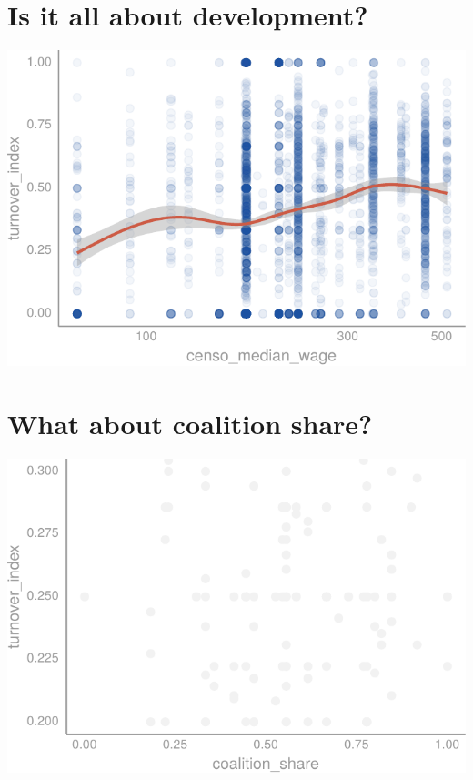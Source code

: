 \documentclass[12pt,]{article}
\begin{document}
\hypertarget{is-it-all-about-development}{%
\section{Is it all about
development?}\label{is-it-all-about-development}}

\begin{center}\includegraphics{dissertation_files/figure-latex/unnamed-chunk-33-1} \end{center}

\hypertarget{what-about-coalition-share}{%
\section{What about coalition share?}\label{what-about-coalition-share}}

\begin{center}\includegraphics{dissertation_files/figure-latex/unnamed-chunk-34-1} \end{center}
\end{document}
